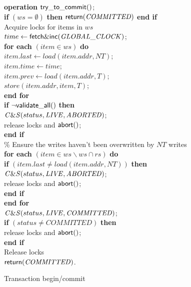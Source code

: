 \documentclass[11pt]{article}
\begin{document}
\begin{figure}[htb]
{{\begin{minipage}[t]{150mm}
\begin{tabbing}
{\bf operation}  ${\sf try\_to\_commit}()$;\\
 \> {\bf if} $(ws = \emptyset)$ {\bf then} ${\sf return}(\mathit{COMMITTED})$ {\bf end if} \\
 \> Acquire locks for items in $ws$ \\
 \> $time \gets {\sf fetch\&inc}(\mathit{GLOBAL\_CLOCK})$; \\
 \> {\bf for each} $(item \in ws)$ {\bf do} \\
 \>\> $item.last \gets load(item.addr, NT)$; \\
 \>\> $item.time \gets time$; \\
 \>\> $item.prev \gets load(item.addr, T)$; \\
 \>\> $store(item.addr, item, T)$; \\
 \> {\bf end for} \\
 \> {\bf if} $\neg{\sf validate\_all}()$ {\bf then} \\
 \>\> ${\sf \mathit{C\&S}}(status, \mathit{LIVE}, \mathit{ABORTED})$; \\
 \>\> release locks and ${\sf abort}()$; \\
 \> {\bf end if} \\
\> \% Ensure the writes haven't been overwritten by $NT$ writes \\
 \> {\bf for each} $(item \in ws \backslash ws \cap rs)$ {\bf do} \\
 \>\> {\bf if} $(item.last \neq load(item.addr, NT))$ {\bf then} \\
 \>\>\> ${\sf \mathit{C\&S}}(status, \mathit{LIVE}, \mathit{ABORTED})$; \\
 \>\>\> release locks and ${\sf abort}()$; \\
 \>\> {\bf end if} \\
 \> {\bf end for} \\
 \> ${\sf \mathit{C\&S}}(status, \mathit{LIVE}, \mathit{COMMITTED})$; \\
 \> {\bf if} $(status \neq \mathit{COMMITTED})$ {\bf then} \\
 \>\> release locks and ${\sf abort}()$; \\
 \> {\bf end if} \\
 \> Release locks \\
 \> ${\sf return}(\mathit{COMMITTED})$. \\


\end{tabbing}
\normalsize
\end{minipage}
}
\caption{Transaction begin/commit}
\label{fig-prevent-looping}
}
\end{figure}



\end{document}

